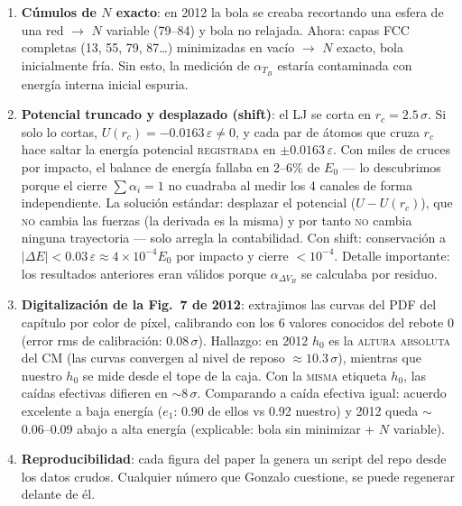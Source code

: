 \documentclass[11pt,a4paper]{article}
\newcommand{\eps}{\varepsilon}
\begin{document}
\begin{enumerate}[leftmargin=1.6em]
    \item \textbf{Cúmulos de $N$ exacto}: en 2012 la bola se creaba
    recortando una esfera de una red $\to$ $N$ variable (79--84) y bola
    no relajada. Ahora: capas FCC completas (13, 55, 79, 87\ldots)
    minimizadas en vacío $\to$ $N$ exacto, bola inicialmente fría. Sin
    esto, la medición de $\alpha_{T_B}$ estaría contaminada con energía
    interna inicial espuria.
    \item \textbf{Potencial truncado y desplazado (shift)}: el LJ se
    corta en $r_c=2.5\,\sigma$. Si solo lo cortas,
    $U(r_c)=-0.0163\,\eps\neq0$, y cada par de átomos que cruza $r_c$
    hace saltar la energía potencial \textsc{registrada} en
    $\pm0.0163\,\eps$. Con miles de cruces por impacto, el balance de
    energía fallaba en 2--6\% de $E_0$ --- lo descubrimos porque el
    cierre $\sum\alpha_i=1$ no cuadraba al medir los 4 canales de forma
    independiente. La solución estándar: desplazar el potencial
    ($U-U(r_c)$), que \textsc{no} cambia las fuerzas (la derivada es la
    misma) y por tanto \textsc{no} cambia ninguna trayectoria --- solo
    arregla la contabilidad. Con shift: conservación a
    $|\Delta E|<0.03\,\eps\approx4\times10^{-4}E_0$ por impacto y cierre
    $<10^{-4}$. Detalle importante: los resultados anteriores eran
    válidos porque $\alpha_{\Delta V_B}$ se calculaba por residuo.
    \item \textbf{Digitalización de la Fig.~7 de 2012}: extrajimos las
    curvas del PDF del capítulo por color de píxel, calibrando con los 6
    valores conocidos del rebote 0 (error rms de calibración:
    $0.08\,\sigma$). Hallazgo: en 2012 $h_0$ es la \textsc{altura
    absoluta} del CM (las curvas convergen al nivel de reposo
    $\approx10.3\,\sigma$), mientras que nuestro $h_0$ se mide desde el
    tope de la caja. Con la \textsc{misma} etiqueta $h_0$, las caídas
    efectivas difieren en $\sim8\,\sigma$. Comparando a caída efectiva
    igual: acuerdo excelente a baja energía ($e_1$: 0.90 de ellos vs
    0.92 nuestro) y 2012 queda $\sim$0.06--0.09 abajo a alta energía
    (explicable: bola sin minimizar + $N$ variable).
    \item \textbf{Reproducibilidad}: cada figura del paper la genera un
    script del repo desde los datos crudos. Cualquier número que Gonzalo
    cuestione, se puede regenerar delante de él.
\end{enumerate}

\end{document}
